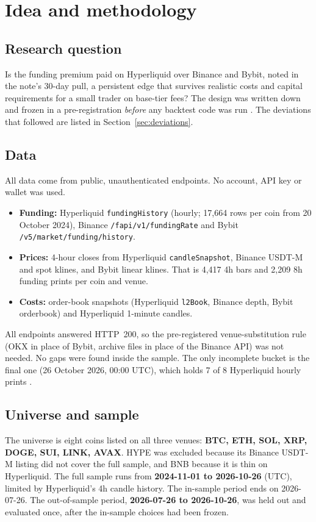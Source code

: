 \documentclass[11pt,a4paper]{article}
\begin{document}
\section{Idea and methodology}
\label{sec:method}

\subsection{Research question}
Is the funding premium paid on Hyperliquid over Binance and Bybit, noted in the note's 30-day pull, a persistent edge that survives realistic costs and capital requirements for a small trader on base-tier fees?
The design was written down and frozen in a pre-registration \emph{before} any backtest code was run \citep{prereg}. The deviations that followed are listed in Section~\ref{sec:deviations}.

\subsection{Data}
All data come from public, unauthenticated endpoints. No account, API key or wallet was used.
\begin{itemize}
\item \textbf{Funding:} Hyperliquid \texttt{fundingHistory} (hourly; 17{,}664 rows per coin from 20 October 2024), Binance \texttt{/fapi/v1/fundingRate} and Bybit \texttt{/v5/market/funding/history}.
\item \textbf{Prices:} 4-hour closes from Hyperliquid \texttt{candleSnapshot}, Binance USDT-M and spot klines, and Bybit linear klines. That is 4{,}417 4h bars and 2{,}209 8h funding prints per coin and venue.
\item \textbf{Costs:} order-book snapshots (Hyperliquid \texttt{l2Book}, Binance depth, Bybit orderbook) and Hyperliquid 1-minute candles.
\end{itemize}
All endpoints answered HTTP~200, so the pre-registered venue-substitution rule (OKX in place of Bybit, archive files in place of the Binance API) was not needed. No gaps were found inside the sample. The only incomplete bucket is the final one (26 October 2026, 00:00 UTC), which holds 7 of 8 Hyperliquid hourly prints \citep{carry_v1}.

\subsection{Universe and sample}
The universe is eight coins listed on all three venues: \textbf{BTC, ETH, SOL, XRP, DOGE, SUI, LINK, AVAX}. HYPE was excluded because its Binance USDT-M listing did not cover the full sample, and BNB because it is thin on Hyperliquid.
The full sample runs from \textbf{2024-11-01 to 2026-10-26} (UTC), limited by Hyperliquid's 4h candle history.
The in-sample period ends on 2026-07-26. The out-of-sample period, \textbf{2026-07-26 to 2026-10-26}, was held out and evaluated once, after the in-sample choices had been frozen.
\end{document}

